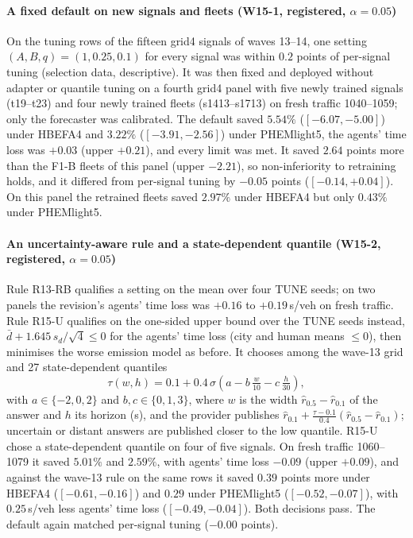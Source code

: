 \paragraph{A fixed default on new signals and fleets (W15-1, registered, $\alpha=0.05$)} On the tuning rows of the fifteen grid4 signals of
waves 13--14, one setting $(A,B,q)=(1,0.25,0.1)$ for every signal was within $0.2$ points of per-signal tuning (selection data,
descriptive). It was then fixed and deployed without adapter or quantile tuning on a fourth grid4 panel with five newly trained signals
(t19--t23) and four newly trained fleets (s1413--s1713) on fresh traffic 1040--1059; only the forecaster was calibrated. The default saved
$5.54\%$ ($[-6.07,-5.00]$) under HBEFA4 and $3.22\%$ ($[-3.91,-2.56]$) under PHEMlight5, the agents' time loss was $+0.03$ (upper $+0.21$),
and every limit was met. It saved $2.64$ points more than the F1-B fleets of this panel (upper $-2.21$), so non-inferiority to retraining
holds, and it differed from per-signal tuning by $-0.05$ points ($[-0.14,+0.04]$). On this panel the retrained fleets saved $2.97\%$ under
HBEFA4 but only $0.43\%$ under PHEMlight5.
\paragraph{An uncertainty-aware rule and a state-dependent quantile (W15-2, registered, $\alpha=0.05$)} Rule R13-RB qualifies a setting on
the mean over four TUNE seeds; on two panels the revision's agents' time loss was $+0.16$ to $+0.19$\,s/veh on fresh traffic. Rule R15-U
qualifies on the one-sided upper bound over the TUNE seeds instead, $\bar d+1.645\,s_d/\sqrt4\le0$ for the agents' time loss (city and
human means $\le0$), then minimises the worse emission model as before. It chooses among the wave-13 grid and 27 state-dependent quantiles
\begin{equation}
\tau(w,h)=0.1+0.4\,\sigma\!\left(a-b\,\tfrac{w}{10}-c\,\tfrac{h}{30}\right),
\end{equation}
with $a\in\{-2,0,2\}$ and $b,c\in\{0,1,3\}$, where $w$ is the width $\hat r_{0.5}-\hat r_{0.1}$ of the answer and $h$ its horizon (s), and the provider publishes
$\hat r_{0.1}+\frac{\tau-0.1}{0.4}(\hat r_{0.5}-\hat r_{0.1})$; uncertain or distant answers are published closer to the low quantile.
R15-U chose a state-dependent quantile on four of five signals. On fresh traffic 1060--1079 it saved $5.01\%$ and $2.59\%$, with agents'
time loss $-0.09$ (upper $+0.09$), and against the wave-13 rule on the same rows it saved $0.39$ points more under HBEFA4 ($[-0.61,-0.16]$)
and $0.29$ under PHEMlight5 ($[-0.52,-0.07]$), with $0.25$\,s/veh less agents' time loss ($[-0.49,-0.04]$). Both decisions pass. The
default again matched per-signal tuning ($-0.00$ points).
